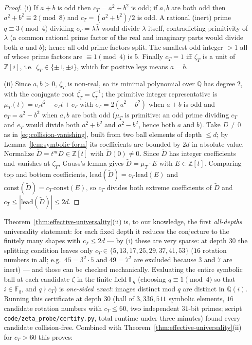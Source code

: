 \documentclass[11pt,a4paper]{article}
\theoremstyle{remark}
\theoremstyle{plain}
\begin{document}
\begin{proof}
(i) If $a+b$ is odd then $c_T = a^2+b^2$ is odd; if $a,b$ are both odd
then $a^2+b^2 \equiv 2 \pmod 8$ and $c_T = (a^2+b^2)/2$ is odd.  A
rational (inert) prime $q \equiv 3 \pmod 4$ dividing $c_T = \lambda
\bar\lambda$ would divide $\lambda$ itself, contradicting primitivity of
$\lambda$ (a common rational prime factor of the real and imaginary
parts would divide both $a$ and $b$); hence all odd prime factors split.
The smallest odd integer $> 1$ all of whose prime factors are
$\equiv 1 \pmod 4$ is $5$.  Finally $c_T = 1$ iff $\zeta_T$ is a unit of
$\mathbb{Z}[i]$, i.e.\ $\zeta_T \in \{\pm 1, \pm i\}$, which for
positive legs means $a = b$.

(ii) Since $a, b > 0$, $\zeta_T$ is non-real, so its minimal polynomial
over $\mathbb{Q}$ has degree $2$, with the conjugate root
$\overline{\zeta_T} = \zeta_T^{-1}$; the primitive integer
representative is $\mu_T(t) = c_T t^2 - e_T t + c_T$ with
$e_T = 2(a^2-b^2)$ when $a + b$ is odd and $e_T = a^2 - b^2$ when $a, b$
are both odd ($\mu_T$ is primitive: an odd prime dividing $c_T$ and
$e_T$ would divide both $a^2+b^2$ and $a^2-b^2$, hence both $a$ and
$b$).  Take $D \neq 0$ as in \eqref{eq:collision-vanishing}, built from
two ball elements of depth $\le d$; by Lemma~\ref{lem:symbolic-form}
its coefficients are bounded by $2d$ in absolute value.  Normalize
$\widetilde D = t^m D \in \mathbb{Z}[t]$ with
$\widetilde D(0) \neq 0$.  Since $\widetilde D$ has integer
coefficients and vanishes at $\zeta_T$, Gauss's lemma gives
$\widetilde D = \mu_T \cdot E$ with $E \in \mathbb{Z}[t]$.
Comparing top and bottom coefficients,
$\mathrm{lead}(\widetilde D) = c_T\, \mathrm{lead}(E)$ and
$\mathrm{const}(\widetilde D) = c_T\, \mathrm{const}(E)$, so $c_T$
divides both extreme coefficients of $\widetilde D$ and
$c_T \le |\mathrm{lead}(\widetilde D)| \le 2d$.
\end{proof}

Theorem~\ref{thm:effective-universality}(ii) is, to our knowledge, the
first \emph{all-depths} universality statement: for each fixed depth it
reduces the conjecture to the finitely many shapes with
$c_T \le 2d$ --- by (i) these are very sparse: at depth $30$ the
splitting condition leaves only
$c_T \in \{5, 13, 17, 25, 29, 37, 41, 53\}$
($16$ rotation numbers in all; e.g.\ $45 = 3^2 \cdot 5$ and $49 = 7^2$
are excluded because $3$ and $7$ are inert) --- and those can be checked
mechanically.  Evaluating the entire symbolic
ball at each candidate $\zeta$ in the finite field $\mathbb{F}_q$
(choosing $q \equiv 1 \pmod 4$ so that $i \in \mathbb{F}_q$, and
$q \nmid c_T$) is \emph{one-sided exact}: images distinct mod $q$ are
distinct in $\mathbb{Q}(i)$.  Running this certificate at depth $30$
(ball of $3{,}336{,}511$ symbolic elements, $16$ candidate rotation
numbers with $c_T \le 60$, two independent $31$-bit primes; script
\texttt{code/zeta\_probe/certify.py}, total runtime under three
minutes) found every candidate collision-free.  Combined with
Theorem~\ref{thm:effective-universality}(ii) for $c_T > 60$ this
proves:
\end{document}
